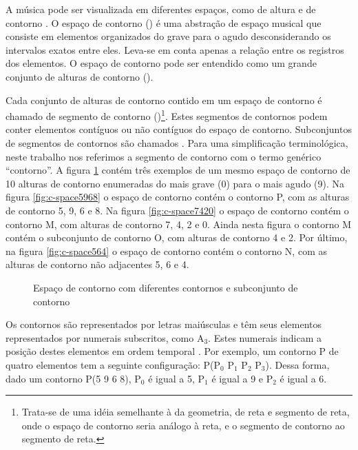 A música pode ser visualizada em diferentes espaços, como de altura e
de contorno \cite{morris87:composition}. O espaço de contorno
() é uma abstração de espaço musical que consiste em
elementos organizados do grave para o agudo desconsiderando os
intervalos exatos entre eles. Leva-se em conta apenas a relação entre
os registros dos elementos. O espaço de contorno pode ser entendido
como um grande conjunto de alturas de contorno ().

Cada conjunto de alturas de contorno contido em um espaço de contorno
é chamado de segmento de contorno ()\footnote{Trata-se de uma
  idéia semelhante à da geometria, de reta e segmento de reta, onde o
  espaço de contorno seria análogo à reta, e o segmento de contorno ao
  segmento de reta.}. Estes segmentos de contornos podem conter
elementos contíguos ou não contíguos do espaço de
contorno. Subconjuntos de segmentos de contornos são chamados
. Para uma simplificação terminológica, neste trabalho nos
referimos a segmento de contorno com o termo genérico ``contorno''. A
figura \ref{fig:c-space} contém três exemplos de um mesmo espaço de
contorno de 10 alturas de contorno enumeradas do mais grave (0) para o
mais agudo (9). Na figura \ref{fig:c-space5968} o espaço de contorno
contém o contorno P, com as alturas de contorno 5, 9, 6 e 8. Na figura
\ref{fig:c-space7420} o espaço de contorno contém o contorno M, com
alturas de contorno 7, 4, 2 e 0. Ainda nesta figura o contorno M
contém o subconjunto de contorno O, com alturas de contorno 4 e 2. Por
último, na figura \ref{fig:c-space564} o espaço de contorno contém o
contorno N, com as alturas de contorno não adjacentes 5, 6 e 4.

\begin{figure}
  \centering

  \caption{Espaço de contorno com diferentes contornos e subconjunto
    de contorno}
  \label{fig:c-space}
\end{figure}

Os contornos são representados por letras maiúsculas e têm seus
elementos representados por numerais subscritos, como A$_3$. Estes
numerais indicam a posição destes elementos em ordem temporal
\cite{marvin.ea87:relating}. Por exemplo, um contorno P de quatro
elementos tem a seguinte configuração: P(P$_0$ P$_1$ P$_2$
P$_3$). Dessa forma, dado um contorno P(5 9 6 8), P$_0$ é igual a 5,
P$_1$ é igual a 9 e P$_2$ é igual a 6.

